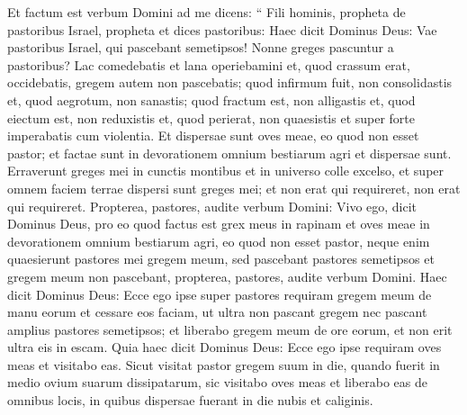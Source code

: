 \begin{biblechapter}
\begin{biblechapter}
\begin{biblechapter}
\begin{biblechapter}
\begin{biblechapter}
\begin{biblechapter}
\begin{biblechapter}
\begin{biblechapter}
\begin{biblechapter}
\begin{biblechapter}
\begin{biblechapter}
\begin{biblechapter}
\begin{biblechapter}
\begin{biblechapter}
\begin{biblechapter}
\begin{biblechapter}
\begin{biblechapter}
\begin{biblechapter}
\begin{biblechapter}
\begin{biblechapter}
\begin{biblechapter}
\begin{biblechapter}
\begin{biblechapter}
\begin{biblechapter}
\begin{biblechapter}
\begin{biblechapter}
\begin{biblechapter}
\begin{biblechapter}
\begin{biblechapter}
\begin{biblechapter}
\begin{biblechapter}
\begin{biblechapter}
\begin{biblechapter}
\begin{biblechapter}
\verse Et factum est verbum Domini ad me dicens: 
\verse “ Fili hominis, propheta de pastoribus Israel, propheta et dices pastoribus: Haec dicit Dominus Deus: Vae pastoribus Israel, qui pascebant semetipsos! Nonne greges pascuntur a pastoribus? 
\verse Lac comedebatis et lana operiebamini et, quod crassum erat, occidebatis, gregem autem non pascebatis; 
\verse quod infirmum fuit, non consolidastis et, quod aegrotum, non sanastis; quod fractum est, non alligastis et, quod eiectum est, non reduxistis et, quod perierat, non quaesistis et super forte imperabatis cum violentia. 
\verse Et dispersae sunt oves meae, eo quod non esset pastor; et factae sunt in devorationem omnium bestiarum agri et dispersae sunt. 
\verse Erraverunt greges mei in cunctis montibus et in universo colle excelso, et super omnem faciem terrae dispersi sunt greges mei; et non erat qui requireret, non erat qui requireret.
 \verse Propterea, pastores, audite verbum Domini: 
\verse Vivo ego, dicit Dominus Deus, pro eo quod factus est grex meus in rapinam et oves meae in devorationem omnium bestiarum agri, eo quod non esset pastor, neque enim quaesierunt pastores mei gregem meum, sed pascebant pastores semetipsos et gregem meum non pascebant, 
 \verse propterea, pastores, audite verbum Domini. 
\verse Haec dicit Dominus Deus: Ecce ego ipse super pastores requiram gregem meum de manu eorum et cessare eos faciam, ut ultra non pascant gregem nec pascant amplius pastores semetipsos; et liberabo gregem meum de ore eorum, et non erit ultra eis in escam.
 \verse Quia haec dicit Dominus Deus: Ecce ego ipse requiram oves meas et visitabo eas. 
\verse Sicut visitat pastor gregem suum in die, quando fuerit in medio ovium suarum dissipatarum, sic visitabo oves meas et liberabo eas de omnibus locis, in quibus dispersae fuerant in die nubis et caliginis. 

\end{biblechapter}
\end{biblechapter}
\end{biblechapter}
\end{biblechapter}
\end{biblechapter}
\end{biblechapter}
\end{biblechapter}
\end{biblechapter}
\end{biblechapter}
\end{biblechapter}
\end{biblechapter}
\end{biblechapter}
\end{biblechapter}
\end{biblechapter}
\end{biblechapter}
\end{biblechapter}
\end{biblechapter}
\end{biblechapter}
\end{biblechapter}
\end{biblechapter}
\end{biblechapter}
\end{biblechapter}
\end{biblechapter}
\end{biblechapter}
\end{biblechapter}
\end{biblechapter}
\end{biblechapter}
\end{biblechapter}
\end{biblechapter}
\end{biblechapter}
\end{biblechapter}
\end{biblechapter}
\end{biblechapter}
\end{biblechapter}
